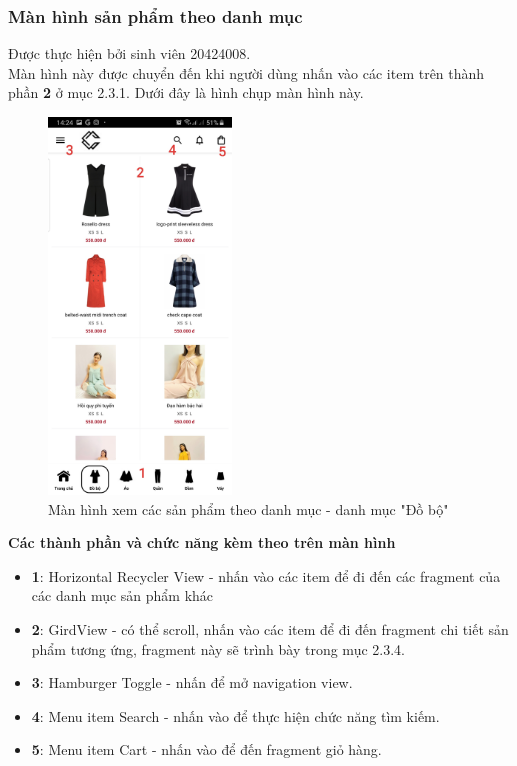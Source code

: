 \documentclass[12pt]{article}
\begin{document}
\newpage
\subsubsection{Màn hình sản phẩm theo danh mục}
Được thực hiện bởi sinh viên 20424008.\\

\indent Màn hình này được chuyển đến khi người dùng nhấn vào các item trên thành phần \textbf{2} ở mục 2.3.1. Dưới đây là hình chụp màn hình này.

\begin{figure}[H]
    \centering
    \includegraphics[height=10cm]{images/18.png}
    \caption{Màn hình xem các sản phẩm theo danh mục - danh mục "Đồ bộ"}
\end{figure}

\indent \textbf{Các thành phần và chức năng kèm theo trên màn hình}
\begin{itemize}
    \item \textbf{1}: Horizontal Recycler View - nhấn vào các item để đi đến các fragment của các danh mục sản phẩm khác
    \item \textbf{2}: GirdView - có thể scroll, nhấn vào các item để đi đến fragment chi tiết sản phẩm tương ứng, fragment này sẽ trình bày trong mục 2.3.4.
    \item \textbf{3}: Hamburger Toggle - nhấn để mở navigation view.
    \item \textbf{4}: Menu item Search - nhấn vào để thực hiện chức năng tìm kiếm.
    \item \textbf{5}: Menu item Cart - nhấn vào để đến fragment giỏ hàng.
\end{itemize}
\end{document}
